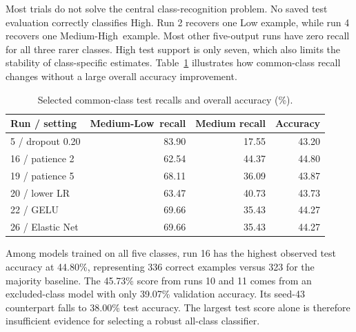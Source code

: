 \documentclass[11pt,letterpaper]{article}
\newcommand{\ML}{Medium-Low}
\newcommand{\MH}{Medium-High}
\begin{document}
Most trials do not solve the central class-recognition problem. No saved test evaluation correctly classifies High. Run 2 recovers one Low example, while run 4 recovers one \MH\ example. Most other five-output runs have zero recall for all three rarer classes. High test support is only seven, which also limits the stability of class-specific estimates. Table~\ref{tab:recall} illustrates how common-class recall changes without a large overall accuracy improvement.

\begin{table}[!htbp]
\caption{Selected common-class test recalls and overall accuracy (\%).}
\label{tab:recall}
\centering\small\setlength{\tabcolsep}{3pt}
\begin{tabular}{lrrr}
\toprule
Run / setting & \ML\ recall & Medium recall & Accuracy \\
\midrule
5 / dropout 0.20 & 83.90 & 17.55 & 43.20 \\
16 / patience 2 & 62.54 & 44.37 & 44.80 \\
19 / patience 5 & 68.11 & 36.09 & 43.87 \\
20 / lower LR & 63.47 & 40.73 & 43.73 \\
22 / GELU & 69.66 & 35.43 & 44.27 \\
26 / Elastic Net & 69.66 & 35.43 & 44.27 \\
\bottomrule
\end{tabular}
\end{table}

Among models trained on all five classes, run 16 has the highest observed test accuracy at 44.80\%, representing 336 correct examples versus 323 for the majority baseline. The 45.73\% score from runs 10 and 11 comes from an excluded-class model with only 39.07\% validation accuracy. Its seed-43 counterpart falls to 38.00\% test accuracy. The largest test score alone is therefore insufficient evidence for selecting a robust all-class classifier.
\end{document}
